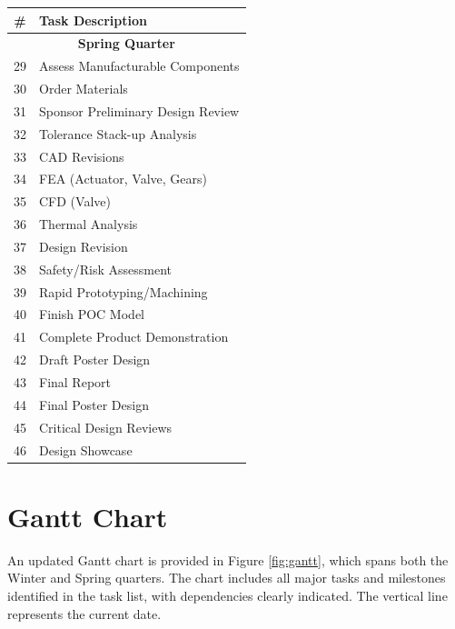 \documentclass[12pt, letterpaper]{report}%
\newcounter{mycounter}           %
\newcounter{sub}[mycounter]      %
\begin{document}
\begin{table}[h]
\centering
\begin{tabular}{@{} c l @{}}
\toprule
\textbf{\#} & \textbf{Task Description} \\
\midrule
\multicolumn{2}{c}{\textbf{Spring Quarter}} \\
\midrule
29 & Assess Manufacturable Components \\
30 & Order Materials \\
31 & Sponsor Preliminary Design Review \\
32 & Tolerance Stack-up Analysis \\
33 & CAD Revisions \\
34 & FEA (Actuator, Valve, Gears) \\
35 & CFD (Valve) \\
36 & Thermal Analysis \\
37 & Design Revision \\
38 & Safety/Risk Assessment \\
39 & Rapid Prototyping/Machining \\
40 & Finish POC Model \\
41 & Complete Product Demonstration \\
42 & Draft Poster Design \\
43 & Final Report \\
44 & Final Poster Design \\
45 & Critical Design Reviews \\
46 & Design Showcase \\
\bottomrule
\end{tabular}
\end{table}



\section{Gantt Chart}
\label{subsec:gantt}

    An updated Gantt chart is provided in Figure \ref{fig:gantt}, which spans both the Winter and Spring quarters. 
    The chart includes all major tasks and milestones identified in the task list, with dependencies clearly indicated. 
    The vertical line represents the current date.


\label{fig:gantt}

\end{document}
